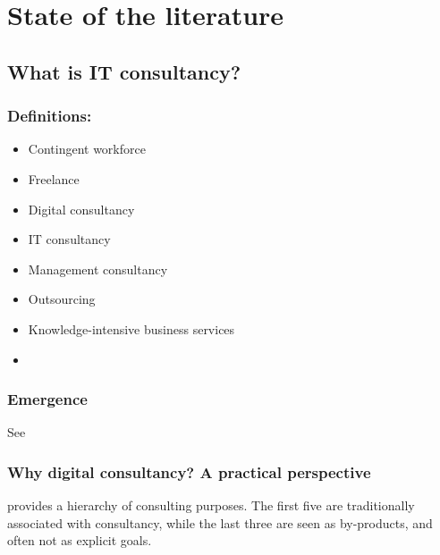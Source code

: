 \documentclass[12pt]{article}
\providecommand{\tightlist}{%
  \setlength{\itemsep}{0pt}\setlength{\parskip}{0pt}}
\begin{document}
\hypertarget{state-of-the-literature}{%
\section{State of the literature}\label{state-of-the-literature}}

\hypertarget{what-is-it-consultancy}{%
\subsection{What is IT consultancy?}\label{what-is-it-consultancy}}

\hypertarget{definitions}{%
\subsubsection{Definitions:}\label{definitions}}

\begin{itemize}
\tightlist
\item
  Contingent workforce
\item
  Freelance
\item
  Digital consultancy
\item
  IT consultancy
\item
  Management consultancy
\item
  Outsourcing
\item
  Knowledge-intensive business services
\item
\end{itemize}

\hypertarget{emergence}{%
\subsubsection{Emergence}\label{emergence}}

See \citep[ 120-130]{armbruster2006}

\hypertarget{why-digital-consultancy-a-practical-perspective}{%
\subsubsection{Why digital consultancy? A practical
perspective}\label{why-digital-consultancy-a-practical-perspective}}

\citet{turner1982} provides a hierarchy of consulting purposes. The
first five are traditionally associated with consultancy, while the last
three are seen as by-products, and often not as explicit goals.
\end{document}
